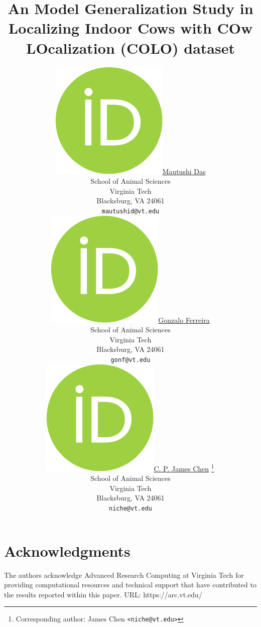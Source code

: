 \documentclass{article}
\title{An Model Generalization Study in Localizing Indoor Cows with COw LOcalization (COLO) dataset}
\author{
    \href{https://orcid.org/0000-0000-0000-0000}{\includegraphics[scale=0.06]{orcid.pdf}\hspace{1mm}Mautushi Das} \\
	School of Animal Sciences\\
	Virginia Tech\\
	Blacksburg, VA 24061 \\
	\texttt{mautushid@vt.edu} \\
	\And
	\href{https://orcid.org/0000-0000-0000-0000}{\includegraphics[scale=0.06]{orcid.pdf}\hspace{1mm}Gonzalo Ferreira} \\
	School of Animal Sciences\\
	Virginia Tech\\
	Blacksburg, VA 24061 \\
	\texttt{gonf@vt.edu} \\
	\And
	\href{https://orcid.org/0000-0002-2018-0702}{\includegraphics[scale=0.06]{orcid.pdf}\hspace{1mm}C. P. James Chen} \thanks{Corresponding author: James Chen \texttt{<niche@vt.edu>}}\\
	School of Animal Sciences\\
	Virginia Tech\\
	Blacksburg, VA 24061 \\
	\texttt{niche@vt.edu}
}
\begin{document}
\maketitle


\newpage




\section*{Acknowledgments}
The authors acknowledge Advanced Research Computing at Virginia Tech for providing computational resources and technical support that have contributed to the results reported within this paper. URL: https://arc.vt.edu/






\newpage


\end{document}
